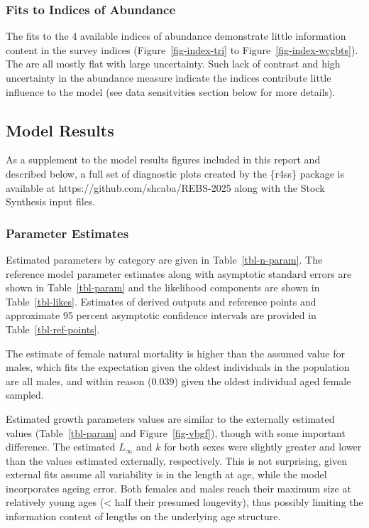 \documentclass[
]{scrartcl}
\begin{document}
\subsubsection{Fits to Indices of
Abundance}\label{fits-to-indices-of-abundance}

The fits to the 4 available indices of abundance demonstrate little
information content in the survey indices (Figure~\ref{fig-index-tri} to
Figure~\ref{fig-index-wcgbts}). The are all mostly flat with large
uncertainty. Such lack of contrast and high uncertainty in the abundance
measure indicate the indices contribute little influence to the model
(see data sensitvities section below for more details).

\subsection{Model Results}\label{model-results}

As a supplement to the model results figures included in this report and
described below, a full set of diagnostic plots created by the \{r4ss\}
package is available at https://github.com/shcaba/REBS-2025 along with
the Stock Synthesis input files.

\subsubsection{Parameter Estimates}\label{parameter-estimates}

Estimated parameters by category are given in Table~\ref{tbl-n-param}.
The reference model parameter estimates along with asymptotic standard
errors are shown in Table~\ref{tbl-param} and the likelihood components
are shown in Table~\ref{tbl-likes}. Estimates of derived outputs and
reference points and approximate 95 percent asymptotic confidence
intervals are provided in Table~\ref{tbl-ref-points}.

The estimate of female natural mortality is higher than the assumed
value for males, which fits the expectation given the oldest individuals
in the population are all males, and within reason (0.039) given the
oldest individual aged female sampled.

Estimated growth parameters values are similar to the externally
estimated values (Table~\ref{tbl-param} and Figure~\ref{fig-vbgf}),
though with some important difference. The estimated \(L_{\infty}\) and
\(k\) for both sexes were slightly greater and lower than the values
estimated externally, respectively. This is not surprising, given
external fits assume all variability is in the length at age, while the
model incorporates ageing error. Both females and males reach their
maximum size at relatively young ages (\textless{} half their presumed
longevity), thus possibly limiting the information content of lengths on
the underlying age structure.
\end{document}
